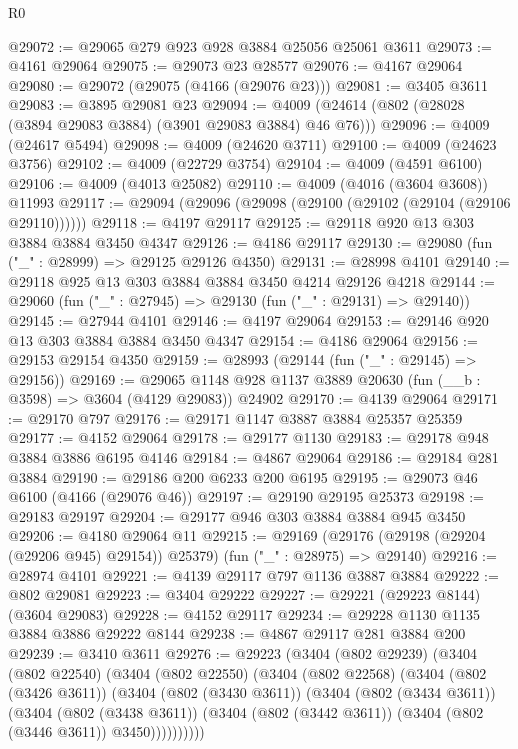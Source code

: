 \begin{lexlean}{R0}
\begin{coremodule}
@29072 := @29065 @279 @923 @928 @3884 @25056 @25061 @3611
@29073 := @4161 @29064
@29075 := @29073 @23 @28577
@29076 := @4167 @29064
@29080 := @29072 (@29075 (@4166 (@29076 @23)))
@29081 := @3405 @3611
@29083 := @3895 @29081 @23
@29094 := @4009 (@24614 (@802 (@28028 (@3894 @29083 @3884) (@3901 @29083 @3884) @46 @76)))
@29096 := @4009 (@24617 @5494)
@29098 := @4009 (@24620 @3711)
@29100 := @4009 (@24623 @3756)
@29102 := @4009 (@22729 @3754)
@29104 := @4009 (@4591 @6100)
@29106 := @4009 (@4013 @25082)
@29110 := @4009 (@4016 (@3604 @3608)) @11993
@29117 := @29094 (@29096 (@29098 (@29100 (@29102 (@29104 (@29106 @29110))))))
@29118 := @4197 @29117
@29125 := @29118 @920 @13 @303 @3884 @3884 @3450 @4347
@29126 := @4186 @29117
@29130 := @29080 (fun ("_" : @28999) => @29125 @29126 @4350)
@29131 := @28998 @4101
@29140 := @29118 @925 @13 @303 @3884 @3884 @3450 @4214 @29126 @4218
@29144 := @29060 (fun ("_" : @27945) => @29130 (fun ("_" : @29131) => @29140))
@29145 := @27944 @4101
@29146 := @4197 @29064
@29153 := @29146 @920 @13 @303 @3884 @3884 @3450 @4347
@29154 := @4186 @29064
@29156 := @29153 @29154 @4350
@29159 := @28993 (@29144 (fun ("_" : @29145) => @29156))
@29169 := @29065 @1148 @928 @1137 @3889 @20630 (fun (__b : @3598) => @3604 (@4129 @29083)) @24902
@29170 := @4139 @29064
@29171 := @29170 @797
@29176 := @29171 @1147 @3887 @3884 @25357 @25359
@29177 := @4152 @29064
@29178 := @29177 @1130
@29183 := @29178 @948 @3884 @3886 @6195 @4146
@29184 := @4867 @29064
@29186 := @29184 @281 @3884
@29190 := @29186 @200 @6233 @200 @6195
@29195 := @29073 @46 @6100 (@4166 (@29076 @46))
@29197 := @29190 @29195 @25373
@29198 := @29183 @29197
@29204 := @29177 @946 @303 @3884 @3884 @945 @3450
@29206 := @4180 @29064 @11
@29215 := @29169
    (@29176 (@29198 (@29204 (@29206 @945) @29154)) @25379)
    (fun ("_" : @28975) => @29140)
@29216 := @28974 @4101
@29221 := @4139 @29117 @797 @1136 @3887 @3884
@29222 := @802 @29081
@29223 := @3404 @29222
@29227 := @29221 (@29223 @8144) (@3604 @29083)
@29228 := @4152 @29117
@29234 := @29228 @1130 @1135 @3884 @3886 @29222 @8144
@29238 := @4867 @29117 @281 @3884 @200
@29239 := @3410 @3611
@29276 := @29223
    (@3404
      (@802 @29239)
      (@3404
        (@802 @22540)
        (@3404
          (@802 @22550)
          (@3404
            (@802 @22568)
            (@3404
              (@802 (@3426 @3611))
              (@3404
                (@802 (@3430 @3611))
                (@3404
                  (@802 (@3434 @3611))
                  (@3404
                    (@802 (@3438 @3611))
                    (@3404 (@802 (@3442 @3611)) (@3404 (@802 (@3446 @3611)) @3450))))))))))

\end{coremodule}
\end{lexlean}
